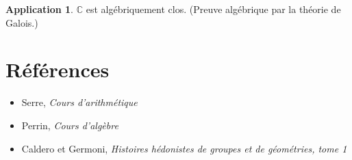 \documentclass[a5paper, 10pt]{article}
\theoremstyle{definition}
\newtheorem{application}[equation]{Application}
\newcounter{n}
\def\C{\mathbb{C}}
\begin{document}
\begin{application}
  $\C$ est algébriquement clos. (Preuve algébrique par la théorie de
  Galois.)
\end{application}

\section{Références}

\begin{itemize}
\item Serre, \emph{Cours d'arithmétique}
\item Perrin, \emph{Cours d'algèbre}
\item Caldero et Germoni, \emph{Histoires hédonistes de groupes et de géométries, tome 1}
\end{itemize}
\end{document}
